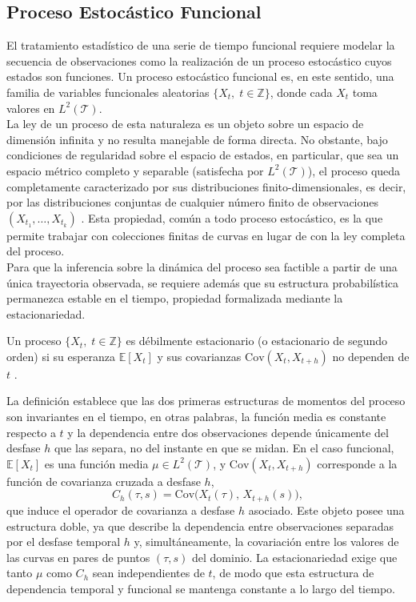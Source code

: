 \subsection{Proceso Estocástico Funcional}
\label{02_02_01_proceso_estocastico_funcional}
El tratamiento estadístico de una serie de tiempo funcional requiere modelar la secuencia de observaciones como la realización de un proceso estocástico cuyos estados son funciones. Un proceso estocástico funcional es, en este sentido, una familia de variables funcionales aleatorias $\{X_t,\; t \in \mathbb{Z}\}$, donde cada $X_t$ toma valores en $L^2(\mathcal{T})$.\\

La ley de un proceso de esta naturaleza es un objeto sobre un espacio de dimensión infinita y no resulta manejable de forma directa. No obstante, bajo condiciones de regularidad sobre el espacio de estados, en particular, que sea un espacio métrico completo y separable (satisfecha por $L^2(\mathcal{T})$), el proceso queda completamente caracterizado por sus distribuciones finito-dimensionales, es decir, por las distribuciones conjuntas de cualquier número finito de observaciones $(X_{t_1}, \dots, X_{t_k})$ \cite{02_02_bosq2000linear}. Esta propiedad, común a todo proceso estocástico, es la que permite trabajar con colecciones finitas de curvas en lugar de con la ley completa del proceso.\\

Para que la inferencia sobre la dinámica del proceso sea factible a partir de una única trayectoria observada, se requiere además que su estructura probabilística permanezca estable en el tiempo, propiedad formalizada mediante la estacionariedad.

\begin{definition}
Un proceso $\{X_t,\; t \in \mathbb{Z}\}$ es débilmente estacionario (o estacionario de segundo orden) si su esperanza $\mathbb{E}[X_t]$ y sus covarianzas $\mathrm{Cov}(X_t, X_{t+h})$ no dependen de $t$ \cite{02_02_bosq2000linear}.
\end{definition}
La definición establece que las dos primeras estructuras de momentos del proceso son invariantes en el tiempo, en otras palabras, la función media es constante respecto a $t$ y la dependencia entre dos observaciones depende únicamente del desfase $h$ que las separa, no del instante en que se midan. En el caso funcional, $\mathbb{E}[X_t]$ es una función media $\mu \in L^2(\mathcal{T})$, y $\mathrm{Cov}(X_t, X_{t+h})$ corresponde a la función de covarianza cruzada a desfase $h$,
\begin{equation}
    C_h(\tau, s) = \mathrm{Cov}\bigl(X_t(\tau),\, X_{t+h}(s)\bigr),
\end{equation}
que induce el operador de covarianza a desfase $h$ asociado. Este objeto posee una estructura doble, ya que describe la dependencia entre observaciones separadas por el desfase temporal $h$ y, simultáneamente, la covariación entre los valores de las curvas en pares de puntos $(\tau, s)$ del dominio. La estacionariedad exige que tanto $\mu$ como $C_h$ sean independientes de $t$, de modo que esta estructura de dependencia temporal y funcional se mantenga constante a lo largo del tiempo.\\

